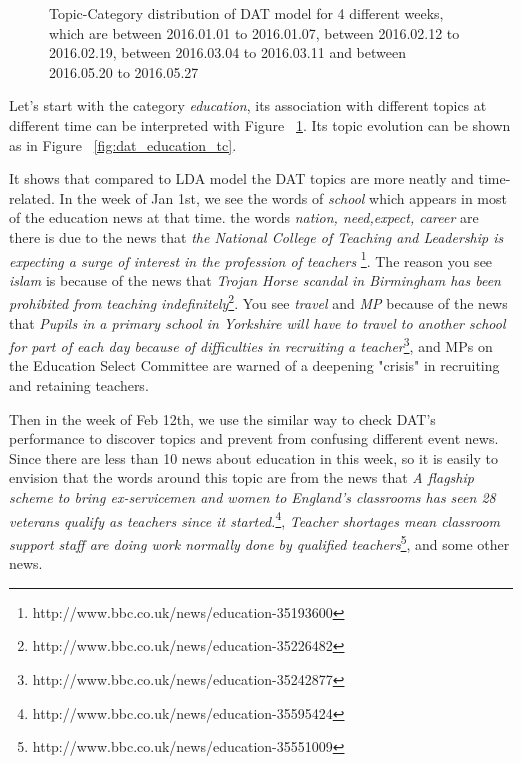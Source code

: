 \begin{figure}[!t]
\caption{\small Topic-Category distribution of DAT model for 4 different weeks, which are between 2016.01.01 to 2016.01.07, between 2016.02.12 to 2016.02.19, between 2016.03.04 to 2016.03.11 and between 2016.05.20 to 2016.05.27}
\label{fig:dattopiccategory}
\end{figure}

Let's start with the category \textit{education}, its association with different topics at different time can be interpreted with Figure ~\ref{fig:dattopiccategory}. Its topic evolution can be shown as in Figure ~\ref{fig:dat_education_tc}.

It shows that compared to LDA model the DAT topics are more neatly and time-related. In the week of Jan 1st, we see the words of \textit{school} which appears in most of the education news at that time. the words \textit{nation, need,expect, career} are there is due to the news that \textit{the National College of Teaching and Leadership is expecting a surge of interest in the profession of teachers} \footnote{http://www.bbc.co.uk/news/education-35193600}. The reason you see \textit{islam} is because of the news that \textit{Trojan Horse scandal in Birmingham has been prohibited from teaching indefinitely}\footnote{http://www.bbc.co.uk/news/education-35226482}. You see \textit{travel} and \textit{MP} because of the news that \textit{Pupils in a primary school in Yorkshire will have to travel to another school for part of each day because of difficulties in recruiting a teacher}\footnote{http://www.bbc.co.uk/news/education-35242877}, and MPs on the Education Select Committee are warned of a deepening "crisis" in recruiting and retaining teachers.

Then in the week of Feb 12th, we use the similar way to check DAT's performance to discover topics and prevent from confusing different event news. Since there are less than 10 news about education in this week, so it is easily to envision that the words around this topic are from the news that \textit{A flagship scheme to bring ex-servicemen and women to England's classrooms has seen 28 veterans qualify as teachers since it started.}\footnote{http://www.bbc.co.uk/news/education-35595424}, \textit{Teacher shortages mean classroom support staff are doing work normally done by qualified teachers}\footnote{http://www.bbc.co.uk/news/education-35551009}, and some other news. 

